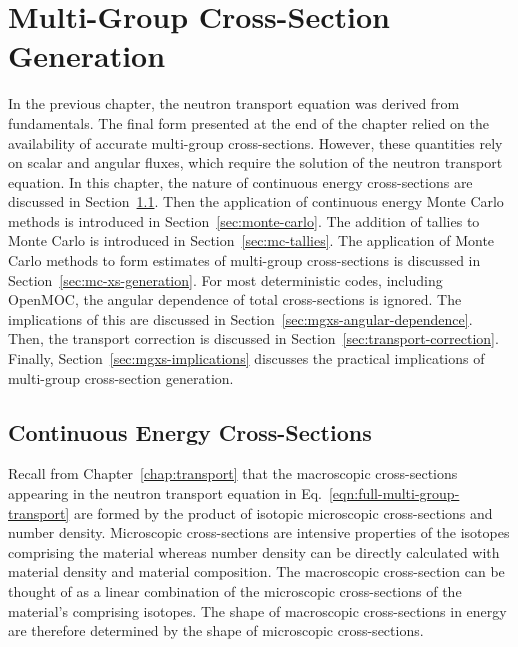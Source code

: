 \chapter{Multi-Group Cross-Section Generation}
\label{chap:mgxs}

In the previous chapter, the neutron transport equation was derived from fundamentals. The final form presented at the end of the chapter relied on the availability of accurate multi-group cross-sections. However, these quantities rely on scalar and angular fluxes, which require the solution of the neutron transport equation. In this chapter, the nature of continuous energy cross-sections are discussed in Section~\ref{sec:continuous-energy-xs}. Then the application of continuous energy Monte Carlo methods is introduced in Section~\ref{sec:monte-carlo}. The addition of tallies to Monte Carlo is introduced in Section~\ref{sec:mc-tallies}. The application of Monte Carlo methods to form estimates of multi-group cross-sections is discussed in Section~\ref{sec:mc-xs-generation}. For most deterministic codes, including OpenMOC, the angular dependence of total cross-sections is ignored. The implications of this are discussed in Section~\ref{sec:mgxs-angular-dependence}. Then, the transport correction is discussed in Section~\ref{sec:transport-correction}. Finally, Section~\ref{sec:mgxs-implications} discusses the practical implications of multi-group cross-section generation.

\section{Continuous Energy Cross-Sections}
\label{sec:continuous-energy-xs}

Recall from Chapter~\ref{chap:transport} that the macroscopic cross-sections appearing in the neutron transport equation in Eq.~\ref{eqn:full-multi-group-transport} are formed by the product of isotopic microscopic cross-sections and number density. Microscopic cross-sections are intensive properties of the isotopes comprising the material whereas number density can be directly calculated with material density and material composition. The macroscopic cross-section can be thought of as a linear combination of the microscopic cross-sections of the material's comprising isotopes. The shape of macroscopic cross-sections in energy are therefore determined by the shape of microscopic cross-sections.

